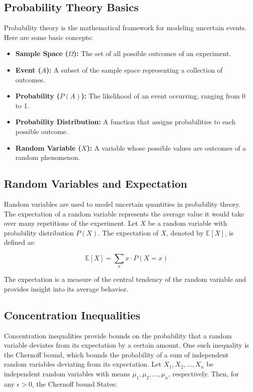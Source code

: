 \documentclass[12pt]{book} %
\begin{document}
\subsection{Probability Theory Basics}

Probability theory is the mathematical framework for modeling uncertain events. Here are some basic concepts:

\begin{itemize}
    \item \textbf{Sample Space (\(\Omega\)):} The set of all possible outcomes of an experiment.
    \item \textbf{Event (\(A\)):} A subset of the sample space representing a collection of outcomes.
    \item \textbf{Probability (\(P(A)\)):} The likelihood of an event occurring, ranging from 0 to 1.
    \item \textbf{Probability Distribution:} A function that assigns probabilities to each possible outcome.
    \item \textbf{Random Variable (\(X\)):} A variable whose possible values are outcomes of a random phenomenon.
\end{itemize}

\subsection{Random Variables and Expectation}

Random variables are used to model uncertain quantities in probability theory. The expectation of a random variable represents the average value it would take over many repetitions of the experiment. Let \(X\) be a random variable with probability distribution \(P(X)\). The expectation of \(X\), denoted by \(\mathbb{E}[X]\), is defined as:

\[\mathbb{E}[X] = \sum_{x} x \cdot P(X = x)\]

The expectation is a measure of the central tendency of the random variable and provides insight into its average behavior.

\subsection{Concentration Inequalities}

Concentration inequalities provide bounds on the probability that a random variable deviates from its expectation by a certain amount. One such inequality is the Chernoff bound, which bounds the probability of a sum of independent random variables deviating from its expectation. Let \(X_1, X_2, \ldots, X_n\) be independent random variables with means \(\mu_1, \mu_2, \ldots, \mu_n\), respectively. Then, for any \(\epsilon > 0\), the Chernoff bound States:
\end{document}
